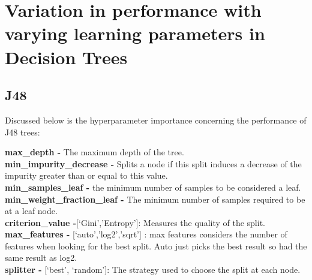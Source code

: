 \documentclass[11pt]{article}
\begin{document}
\section{Variation in performance with varying learning parameters in Decision Trees}

\subsection{J48}

Discussed below is the hyperparameter \cite{SklearnTreeDecisionTreeClassifier} importance concerning the performance of J48 trees:

\textbf{max\_depth -} The maximum depth of the tree. \\
\textbf{min\_impurity\_decrease -} Splits a node if this split induces a decrease of the impurity greater than or equal to this value. \\
\textbf{min\_samples\_leaf -} the minimum number of samples to be considered a leaf. \\
\textbf{min\_weight\_fraction\_leaf -} The minimum number of samples required to be at a leaf node. \\
\textbf{criterion\_value -}[‘Gini’,’Entropy’]: Measures the quality of the split.\\
\textbf{max\_features -} [‘auto’,’log2’,’sqrt’] : max features considers the number of features when looking for the best split. Auto just picks the best result so had the same result as log2. \\
\textbf{splitter -} [‘best’, ‘random’]: The strategy used to choose the split at each node. 
\newline
\end{document}
